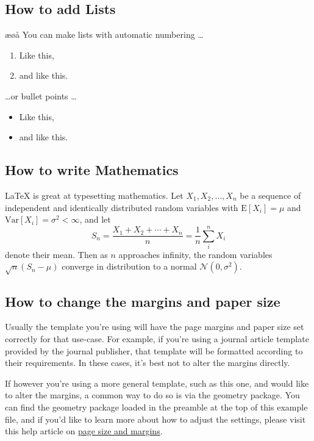 \documentclass{article}
\begin{document}
\subsection{How to add Lists}
æøå
You can make lists with automatic numbering \dots

\begin{enumerate}
\item Like this,
\item and like this.
\end{enumerate}
\dots or bullet points \dots
\begin{itemize}
\item Like this,
\item and like this.
\end{itemize}

\subsection{How to write Mathematics}

\LaTeX{} is great at typesetting mathematics. Let $X_1, X_2, \ldots, X_n$ be a sequence of independent and identically distributed random variables with $\text{E}[X_i] = \mu$ and $\text{Var}[X_i] = \sigma^2 < \infty$, and let
\[S_n = \frac{X_1 + X_2 + \cdots + X_n}{n}
      = \frac{1}{n}\sum_{i}^{n} X_i\]
denote their mean. Then as $n$ approaches infinity, the random variables $\sqrt{n}(S_n - \mu)$ converge in distribution to a normal $\mathcal{N}(0, \sigma^2)$.


\subsection{How to change the margins and paper size}

Usually the template you're using will have the page margins and paper size set correctly for that use-case. For example, if you're using a journal article template provided by the journal publisher, that template will be formatted according to their requirements. In these cases, it's best not to alter the margins directly.

If however you're using a more general template, such as this one, and would like to alter the margins, a common way to do so is via the geometry package. You can find the geometry package loaded in the preamble at the top of this example file, and if you'd like to learn more about how to adjust the settings, please visit this help article on \href{https://www.overleaf.com/learn/latex/page_size_and_margins}{page size and margins}.
\end{document}
